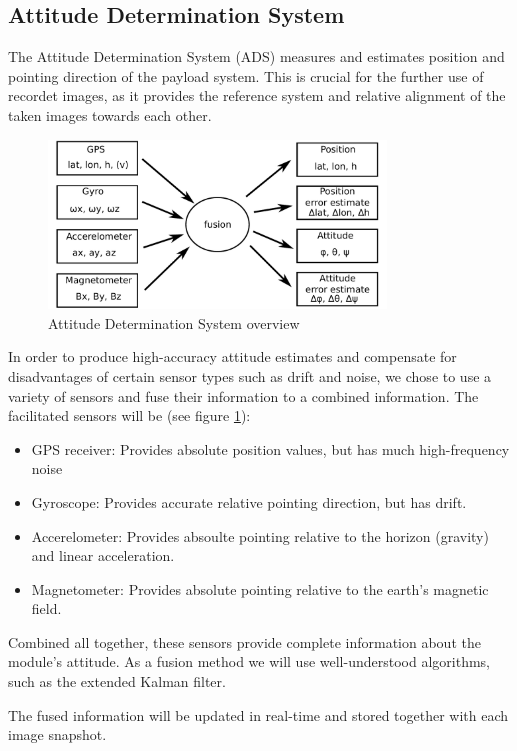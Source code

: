 \documentclass[fontsize=11pt,paper=a4,]{scrartcl}
\begin{document}
\subsection{Attitude Determination System}
The Attitude Determination System (ADS) measures and estimates position and pointing direction of the payload system.
This is crucial for the further use of recordet images, as it provides the reference system and relative alignment of the taken images towards each other.
\begin{figure}
\centering
\includegraphics[width=0.8\textwidth]{figures/ADS_diagram.pdf}
\caption{Attitude Determination System overview}
\label{fig:ADS_overview}
\end{figure}

In order to produce high-accuracy attitude estimates and compensate for disadvantages of certain sensor types such as drift and noise, we chose to use a variety of sensors and fuse their information to a combined information.
The facilitated sensors will be (see figure \ref{fig:ADS_overview}):
\begin{itemize}
\item GPS receiver: Provides absolute position values, but has much high-frequency noise
\item Gyroscope: Provides accurate relative pointing direction, but has drift.
\item Accerelometer: Provides absoulte pointing relative to the horizon (gravity) and linear acceleration.
\item Magnetometer: Provides absolute pointing relative to the earth's magnetic field.
\end{itemize}

Combined all together, these sensors provide complete information about the module's attitude.
As a fusion method we will use well-understood algorithms, such as the extended Kalman filter.

The fused information will be updated in real-time and stored together with each image snapshot.
\end{document}
